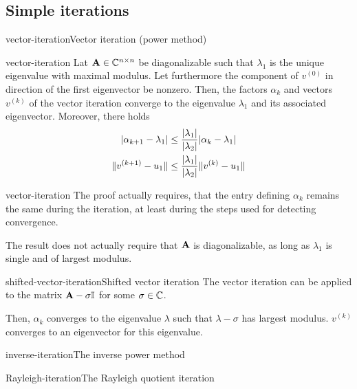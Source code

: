 
\subsection{Simple iterations}

\begin{Algorithm*}{vector-iteration}{Vector iteration (power method)}
  
\end{Algorithm*}

\begin{Theorem}{vector-iteration}
  Lat $\mathbf A\in\mathbb C^{n\times n}$ be diagonalizable such that $\lambda_1$ is the
  unique eigenvalue with maximal modulus. Let furthermore the
  component of $v^{(0)}$ in direction of the first eigenvector be
  nonzero. Then, the factors $\alpha_k$ and vectors $v^{(k)}$ of the
  vector iteration converge to the eigenvalue $\lambda_1$ and its
  associated eigenvector. Moreover, there holds
  \begin{align}
    \lvert\alpha_{k+1}-\lambda_1\rvert
    &\le \frac{\lvert\lambda_1\rvert}{\lvert\lambda_2\rvert} \lvert\alpha_{k}-\lambda_1\rvert\\
    \lVert v^{(k+1)}-u_1\rVert
    &\le \frac{\lvert\lambda_1\rvert}{\lvert\lambda_2\rvert} \lVert v^{(k)}-u_1\rVert
  \end{align}
\end{Theorem}

\begin{Remark}{vector-iteration}
  The proof actually requires, that the entry defining $\alpha_k$
  remains the same during the iteration, at least during the steps
  used for detecting convergence.

  The result does not actually require that $\mathbf A$ is diagonalizable,
  as long as $\lambda_1$ is single and of largest modulus.
\end{Remark}

\begin{Algorithm*}{shifted-vector-iteration}{Shifted vector iteration}
  The vector iteration can be applied to the matrix $\mathbf A-\sigma\mathbb I$
  for some $\sigma\in\mathbb C$.

  Then, $\alpha_k$ converges to the eigenvalue $\lambda$ such that
  $\lambda-\sigma$ has largest modulus. $v^{(k)}$ converges to an
  eigenvector for this eigenvalue.
\end{Algorithm*}

\begin{Algorithm*}{inverse-iteration}{The inverse power method}
  
\end{Algorithm*}

\begin{Algorithm*}{Rayleigh-iteration}{The Rayleigh quotient iteration}
  
\end{Algorithm*}


